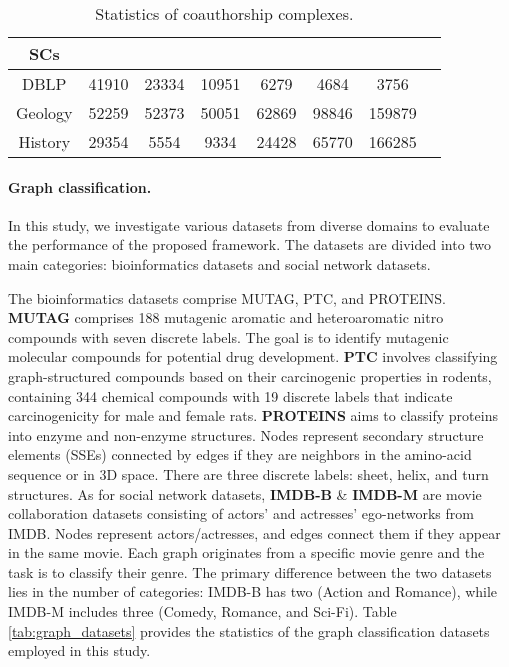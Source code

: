 \documentclass[letterpaper]{article} \usepackage{aaai24}
\theoremstyle{plain}
\theoremstyle{definition}
\theoremstyle{remark}
\begin{document}
\begin{table*}[htbp]
\centering
\begin{tabular}{cccccccc}
\toprule
SCs   &    &  &    &  &  & \\  
\midrule
DBLP    &41910  &23334  &10951  &6279   &4684   &3756 \\
Geology &52259  &52373  &50051  &62869  &98846  &159879\\
History &29354  &5554   &9334   &24428  &65770  &166285\\
\bottomrule
\end{tabular}
\caption{Statistics of coauthorship complexes.}
\label{tab:CCs_statistics}
\end{table*}


\paragraph{Graph classification.}
In this study, we  investigate various datasets from diverse domains to evaluate the performance of the proposed framework. The datasets are divided into two main categories: bioinformatics datasets and social network datasets.


The bioinformatics datasets comprise MUTAG, PTC, and PROTEINS.
\textbf{MUTAG} \cite{data:MUTAG} comprises  188 mutagenic aromatic and heteroaromatic nitro compounds with seven discrete labels. The goal is to identify mutagenic molecular compounds for potential drug development.
\textbf{PTC} \cite{data:PTC} involves classifying graph-structured compounds based on their carcinogenic properties in rodents, containing 344 chemical compounds with 19 discrete labels that indicate carcinogenicity for male and female rats.
\textbf{PROTEINS} \cite{data:proteins2005} aims to classify proteins into enzyme and non-enzyme structures. Nodes represent secondary structure elements (SSEs) connected by edges if they are neighbors in the amino-acid sequence or in 3D space. There are three discrete labels: sheet, helix, and turn structures.
As for social network datasets, \textbf{IMDB-B} \& \textbf{IMDB-M} \cite{data:IMDB-REDDIT} are movie collaboration datasets consisting of actors' and actresses' ego-networks from IMDB.  Nodes represent actors/actresses, and edges connect them if they appear in the same movie. Each graph originates from a specific movie genre and the task is to classify their genre. The primary difference between the two datasets lies in the number of categories: IMDB-B has two (Action and Romance), while IMDB-M includes three (Comedy, Romance, and Sci-Fi).
Table \ref{tab:graph_datasets} provides the statistics of the graph classification  datasets employed in this study. 
\end{document}
